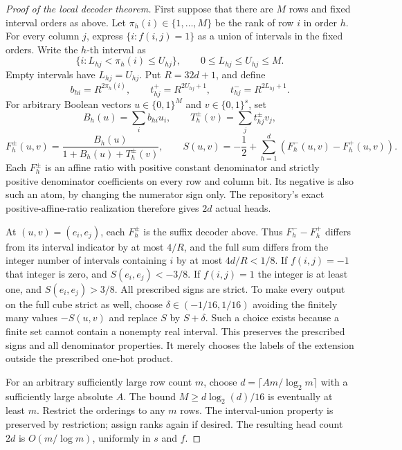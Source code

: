\documentclass[11pt]{article}
\newcommand{\1}{\mathbf 1}
\begin{document}
\begin{proof}[Proof of the local decoder theorem]
First suppose that there are $M$ rows and fixed interval orders as above.
Let $\pi_h(i)\in\{1,\ldots,M\}$ be the rank of row $i$ in order $h$.
For every column $j$, express $\{i:f(i,j)=1\}$ as a union of intervals
in the fixed orders. Write the $h$-th interval as
\[
 \{i:L_{hj}<\pi_h(i)\leq U_{hj}\},\qquad
 0\leq L_{hj}\leq U_{hj}\leq M.
\]
Empty intervals have $L_{hj}=U_{hj}$. Put $R=32d+1$, and define
\[
 b_{hi}=R^{2\pi_h(i)},\qquad
 t^+_{hj}=R^{2U_{hj}+1},\qquad t^-_{hj}=R^{2L_{hj}+1}.
\]
For arbitrary Boolean vectors $u\in\{0,1\}^M$ and
$v\in\{0,1\}^s$, set
\[
 B_h(u)=\sum_i b_{hi}u_i,\qquad
 T_h^\pm(v)=\sum_j t^\pm_{hj}v_j,
\]
\[
 F_h^\pm(u,v)=\frac{B_h(u)}{1+B_h(u)+T_h^\pm(v)},
 \qquad
 S(u,v)=-\frac12+\sum_{h=1}^d(F_h^-(u,v)-F_h^+(u,v)).
\]
Each $F_h^\pm$ is an affine ratio with positive constant denominator and
strictly positive denominator coefficients on every row and column bit.
Its negative is also such an atom, by changing the numerator sign only.
The repository's exact positive-affine-ratio realization therefore gives
$2d$ actual heads.

At $(u,v)=(e_i,e_j)$, each $F_h^\pm$ is the suffix decoder above.
Thus $F_h^--F_h^+$ differs from its interval indicator by at most $4/R$,
and the full sum differs from the integer number of intervals containing
$i$ by at most $4d/R<1/8$. If $f(i,j)=-1$ that integer is zero, and
$S(e_i,e_j)<-3/8$. If $f(i,j)=1$ the integer is at least one, and
$S(e_i,e_j)>3/8$. All prescribed signs are strict. To make every output on the full cube
strict as well, choose $\delta\in(-1/16,1/16)$ avoiding the finitely many
values $-S(u,v)$ and replace $S$ by $S+\delta$. Such a choice exists because
a finite set cannot contain a nonempty real interval. This preserves the
prescribed signs and all denominator properties. It merely chooses the
labels of the extension outside the prescribed one-hot product.

For an arbitrary sufficiently large row count $m$, choose
$d=\lceil A m/\log_2 m\rceil$ with a sufficiently large absolute $A$.
The bound $M\geq d\log_2(d)/16$ is eventually at least $m$.
Restrict the orderings to any $m$ rows. The interval-union property is
preserved by restriction; assign ranks again if desired. The resulting
head count $2d$ is $O(m/\log m)$, uniformly in $s$ and $f$.
\end{proof}
\end{document}
